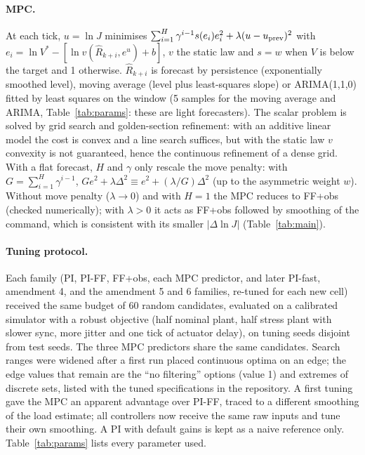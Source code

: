 \documentclass[smallextended]{svjour3}
\begin{document}
\paragraph{MPC.} At each tick, $u=\ln J$ minimises $\sum_{i=1}^{H}\gamma^{i-1}s(e_i)e_i^2+\lambda(u-u_{\rm prev})^2$ with
$e_i=\ln V^*-[\ln v(\hat R_{k+i},e^{u})+b]$, $v$ the static law and $s=w$ when $V$ is below the target and 1 otherwise. $\hat R_{k+i}$ is
forecast by persistence (exponentially smoothed level), moving average (level plus least-squares slope) or ARIMA(1,1,0) fitted by least squares on the
window (5 samples for the moving average and ARIMA, Table~\ref{tab:params}: these are light forecasters). The scalar problem is solved by grid search and golden-section refinement: with an additive linear model the cost is convex and a line search suffices, but with the static law $v$ convexity is not guaranteed, hence the continuous refinement of a dense grid. With a flat forecast, $H$ and $\gamma$ only rescale the move penalty: with $G=\sum_{i=1}^{H}\gamma^{i-1}$, $G e^2+\lambda\Delta^2 \equiv e^2+(\lambda/G)\Delta^2$ (up to the asymmetric weight $w$). Without move penalty ($\lambda\to0$) and with $H=1$ the MPC reduces to FF+obs (checked numerically); with $\lambda>0$ it acts as FF+obs followed by smoothing of the command, which is consistent with its smaller $|\Delta\ln J|$ (Table~\ref{tab:main}).

\paragraph{Tuning protocol.}
Each family (PI, PI-FF, FF+obs, each MPC predictor, and later PI-fast, amendment 4, and the amendment 5 and 6 families, re-tuned for each new cell) received the same budget of 60 random candidates, evaluated on a
calibrated simulator with a robust objective (half nominal plant, half stress plant with slower sync, more jitter and one tick of actuator delay),
on tuning seeds disjoint from test seeds. The three MPC predictors share the same candidates. Search ranges were widened after a first run placed continuous optima on an edge; the edge values that remain are the ``no filtering'' options (value 1) and extremes of discrete sets, listed with the tuned specifications in the repository. A first tuning gave the MPC an apparent advantage over PI-FF, traced to a different smoothing of the load estimate;
all controllers now receive the same raw inputs and tune their own smoothing. A PI with default gains is kept as a naive reference only. Table~\ref{tab:params} lists every parameter used.

\end{document}
